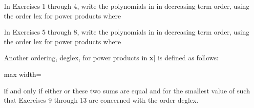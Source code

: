 \documentclass[11pt,oneside]{article}
\begin{document}
\begin{BookBody}


\noindent In Exercises 1 through 4, write the polynomials in  in decreasing term order, using the order lex for power products  where 





\noindent In Exercises 5 through 8, write the polynomials in  in decreasing term order, using the order lex for power products  where 





\noindent Another ordering, deglex, for power products in \BookInline{F[}\textbf{x}] is defined as follows:

\begin{center}\begin{adjustbox}{max width=\linewidth}\end{adjustbox}\end{center}

\noindent if and only if either  or these two sums are equal and  for the smallest value of  such that  Exercises 9 through 13 are concerned with the order deglex.



\end{BookBody}
\end{document}
